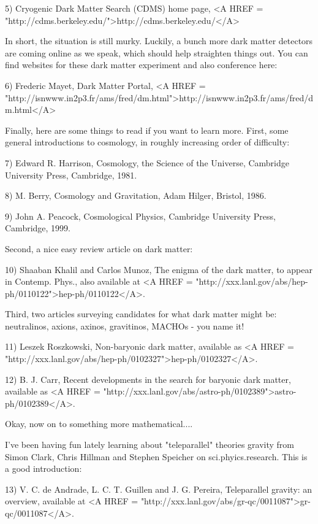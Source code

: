 5) Cryogenic Dark Matter Search (CDMS) home page, 
<A HREF = "http://cdms.berkeley.edu/">http://cdms.berkeley.edu/</A>

In short, the situation is still murky.  Luckily, a bunch more dark 
matter detectors are coming online as we speak, which should help
straighten things out.  You can find websites for these dark matter
experiment and also conference here:

6) Frederic Mayet, Dark Matter Portal, <A HREF = "http://isnwww.in2p3.fr/ams/fred/dm.html">http://isnwww.in2p3.fr/ams/fred/dm.html</A>

Finally, here are some things to read if you want to learn more.  First,
some general introductions to cosmology, in roughly increasing order
of difficulty:

7) Edward R. Harrison, Cosmology, the Science of the Universe, Cambridge
University Press, Cambridge, 1981.

8) M. Berry, Cosmology and Gravitation, Adam Hilger, Bristol, 1986. 

9) John A. Peacock, Cosmological Physics, Cambridge University Press, 
Cambridge, 1999. 

Second, a nice easy review article on dark matter:

10) Shaaban Khalil and Carlos Munoz, The enigma of the dark matter,
to appear in Contemp. Phys., also available at 
<A HREF = "http://xxx.lanl.gov/abs/hep-ph/0110122">hep-ph/0110122</A>.

Third, two articles surveying candidates for what dark matter might be:
neutralinos, axions, axinos, gravitinos, MACHOs - you name it!

11) Leszek Roszkowski, Non-baryonic dark matter, available as
<A HREF = "http://xxx.lanl.gov/abs/hep-ph/0102327">hep-ph/0102327</A>.

12) B. J. Carr, Recent developments in the search for baryonic dark
matter, available as <A HREF = "http://xxx.lanl.gov/abs/astro-ph/0102389">astro-ph/0102389</A>.

Okay, now on to something more mathematical....

I've been having fun lately learning about "teleparallel" theories
gravity from Simon Clark, Chris Hillman and Stephen Speicher on
sci.phyics.research.  This is a good introduction:

13) V. C. de Andrade, L. C. T. Guillen and J. G. Pereira, Teleparallel
gravity: an overview, available at <A HREF = "http://xxx.lanl.gov/abs/gr-qc/0011087">gr-qc/0011087</A>.

